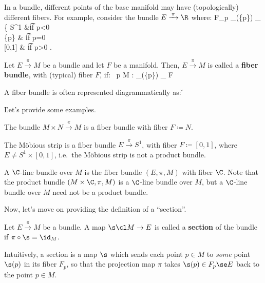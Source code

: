 \be
In a bundle, different points of the base manifold may have (topologically) different fibers. For example, consider
the bundle $E\xrightarrow{\,\pi\,}\R$ where:
\bse
F_p \coloneqq {}_\pi(\{p\}) \cong_ \left\{  S^1 &\t{if }p<0\\ \{p\} & \t{if }p=0\\ {}
[0,1] & \t{if } p>0 \ea \right.
\ese
\ee

Let $E\xrightarrow{\,\pi\,}M$ be a bundle and let $F$ be a manifold. Then, $E\xrightarrow{\,\pi\,}M$ is called a
\textbf{fiber bundle}, with (typical) fiber $F$, if:
\bse
\forall \, p \in M : _\pi(\{p\}) \cong_ F
\ese
\ed

A fiber bundle is often represented diagrammatically as: \v
\bse
{}
\ese

\v

Let's provide some examples.

\be
The bundle $M\times N\xrightarrow{\,\pi\,}M$ is a fiber bundle with fiber $F \coloneqq N$.
\ee

\be
The Möbious strip is a fiber bundle $E\xrightarrow{\,\pi\,}S^1$, with fiber $F \coloneqq [0,1]$, where $E\neq
S^1\times[0,1]$, i.e.\ the Möbious strip is not a product bundle.
\ee

\be
A $\C$-line bundle over $M$ is the fiber bundle $(E,\pi,M)$ with fiber $\C$. Note that the product bundle $(M\times
\C,\pi,M)$ is a $\C$-line bundle over $M$, but a $\C$-line bundle over $M$ need not be a product bundle.
\ee

Now, let's move on providing the definition of a ``section''.

\bd [Section]
Let $E\xrightarrow{\,\pi\,}M$ be a bundle. A map $\s\cl M \to E$ is called a \textbf{section} of the bundle if
$\pi \circ \s = \id_M$.
\ed

Intuitively, a section is a map $\s$ which sends each point $p\in M$ to \emph{some} point $\s(p)$ in its fiber $F_p$,
so that the projection map $\pi$ takes $\s(p) \in F_p\se E$ back to the point $p\in M$.

\vspace{25pt}

